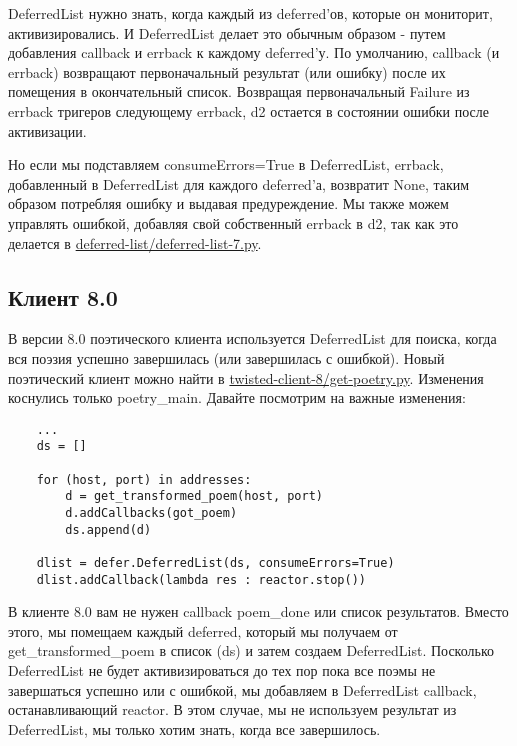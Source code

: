 DeferredList нужно знать, когда каждый из deferred'ов, 
которые он мониторит, активизировались. И DeferredList 
делает это обычным образом - путем добавления 
callback и errback к каждому deferred'у. По умолчанию, 
callback (и errback) возвращают первоначальный 
результат (или ошибку) после их помещения в окончательный 
список. Возвращая первоначальный Failure из 
errback тригеров следующему errback, d2 остается в состоянии 
ошибки после активизации.


Но если мы подставляем consumeErrors=True в DeferredList, 
errback, добавленный в DeferredList для каждого 
deferred'а, возвратит None, таким образом потребляя ошибку и 
выдавая предуреждение. Мы также можем управлять ошибкой, добавляя 
свой собственный errback в d2, так как это делается в 
\href{http://github.com/jdavisp3/twisted-intro/blob/master/deferred-list/deferred-list-7.py#L1}{deferred-list/deferred-list-7.py}.


\subsection{Клиент 8.0}


В версии 8.0 поэтического клиента используется DeferredList 
для поиска, когда вся поэзия успешно завершилась (или 
завершилась с ошибкой). Новый поэтический клиент можно 
найти в \href{http://github.com/jdavisp3/twisted-intro/blob/master/twisted-client-8/get-poetry.py#L1}{twisted-client-8/get-poetry.py}. Изменения коснулись только poetry\_main. Давайте 
посмотрим на важные изменения:

 \begin{verbatim}
    ...
    ds = []

    for (host, port) in addresses:
        d = get_transformed_poem(host, port)
        d.addCallbacks(got_poem)
        ds.append(d)

    dlist = defer.DeferredList(ds, consumeErrors=True)
    dlist.addCallback(lambda res : reactor.stop())
\end{verbatim} 


В клиенте 8.0 вам не нужен callback poem\_done или 
список результатов. Вместо этого, мы помещаем каждый 
deferred, который мы получаем от get\_transformed\_poem 
в список (ds) и затем создаем DeferredList. Посколько 
DeferredList не будет активизироваться до тех пор пока все 
поэмы не завершаться успешно или с ошибкой, мы добавляем 
в DeferredList callback, останавливающий reactor. В этом 
случае, мы не используем результат из DeferredList, мы только 
хотим знать, когда все завершилось.

